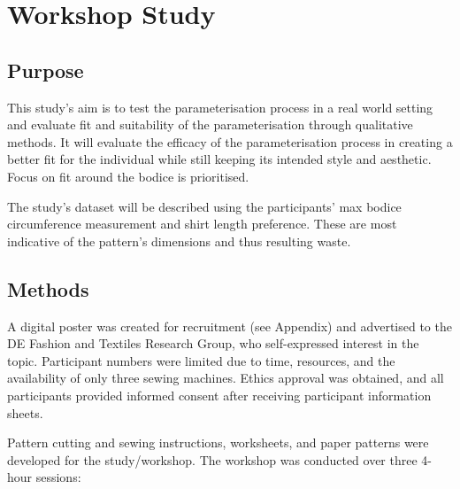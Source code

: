 \section{Workshop Study}
\subsection{Purpose}
This study's aim is to test the parameterisation process in a real world setting and evaluate fit and suitability of the parameterisation through qualitative methods. It will evaluate the efficacy of the parameterisation process in creating a better fit for the individual while still keeping its intended style and aesthetic. Focus on fit around the bodice is prioritised. 

The study's dataset will be described using the participants' max bodice circumference measurement and shirt length preference. These are most indicative of the pattern's dimensions and thus resulting waste.

\subsection{Methods}

A digital poster was created for recruitment (see Appendix) and advertised to the DE Fashion and Textiles Research Group, who self-expressed interest in the topic. Participant numbers were limited due to time, resources, and the availability of only three sewing machines. Ethics approval was obtained, and all participants provided informed consent after receiving participant information sheets.

Pattern cutting and sewing instructions, worksheets, and paper patterns were developed for the study/workshop. The workshop was conducted over three 4-hour sessions:

